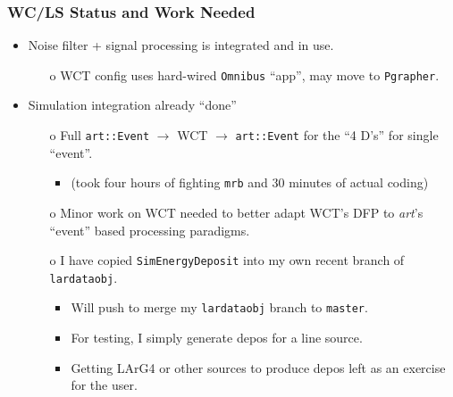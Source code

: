 \documentclass[xcolor=dvipsnames]{beamer}
\begin{document}
\begin{frame}
  \frametitle{WC/LS Status and Work Needed}
  \begin{itemize}\footnotesize
  \item Noise filter + signal processing is integrated and in use.
    \begin{itemize}\scriptsize
    \item[o] WCT config uses hard-wired \texttt{Omnibus} ``app'', may move to \texttt{Pgrapher}.
    \end{itemize}
  \item Simulation integration already ``done''
    \begin{itemize}\scriptsize
    \item[o] Full \texttt{art::Event} $\to$ WCT $\to$ \texttt{art::Event} for the ``4 D's'' for single ``event''.
      \begin{itemize}\tiny
      \item (took four hours of fighting \texttt{mrb} and 30 minutes of actual coding)
      \end{itemize}
    \item[o] Minor work on WCT needed to better adapt WCT's DFP to \textit{art}'s
      ``event'' based processing paradigms.
    \item[o] I have copied \texttt{SimEnergyDeposit} into my own
      recent branch of \texttt{lardataobj}.
      \begin{itemize}\tiny
      \item Will push to merge my \texttt{lardataobj} branch to \texttt{master}.
      \item For testing, I simply generate depos for a line source.
      \item Getting LArG4 or other sources to produce depos left as an exercise for the user.
      \end{itemize}
    \end{itemize}

  \end{itemize}
\end{frame}
\end{document}
